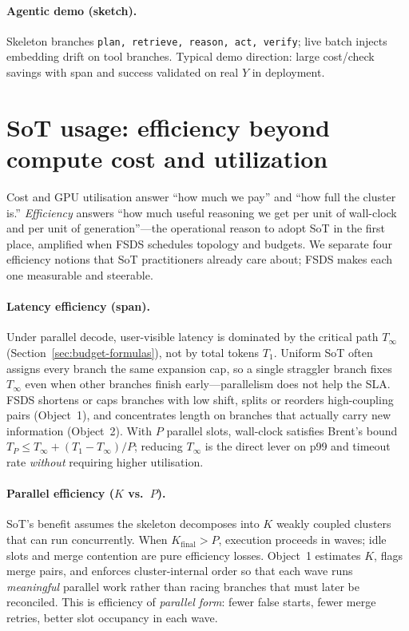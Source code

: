 \documentclass[11pt]{article}
\begin{document}
\paragraph{Agentic demo (sketch).} Skeleton branches
\texttt{plan, retrieve, reason, act, verify}; live batch injects embedding drift
on tool branches. Typical demo direction: large cost/check savings with span and
success validated on real $Y$ in deployment.

\section{SoT usage: efficiency beyond compute cost and utilization}
\label{sec:sot-efficiency}

Cost and GPU utilisation answer ``how much we pay'' and ``how full the cluster
is.'' \emph{Efficiency} answers ``how much useful reasoning we get per unit of
wall-clock and per unit of generation''---the operational reason to adopt SoT in
the first place, amplified when FSDS schedules topology and budgets. We separate
four efficiency notions that SoT practitioners already care about; FSDS makes
each one measurable and steerable.

\paragraph{Latency efficiency (span).} Under parallel decode, user-visible latency
is dominated by the critical path $T_\infty$ (Section~\ref{sec:budget-formulas}),
not by total tokens $T_1$. Uniform SoT often assigns every branch the same
expansion cap, so a single straggler branch fixes $T_\infty$ even when other
branches finish early---parallelism does not help the SLA. FSDS shortens or caps
branches with low shift, splits or reorders high-coupling pairs (Object~1), and
concentrates length on branches that actually carry new information (Object~2).
With $P$ parallel slots, wall-clock satisfies Brent's bound
$T_P \le T_\infty + (T_1-T_\infty)/P$; reducing $T_\infty$ is the direct lever on
p99 and timeout rate \emph{without} requiring higher utilisation.

\paragraph{Parallel efficiency ($K$ vs.\ $P$).} SoT's benefit assumes the skeleton
decomposes into $K$ weakly coupled clusters that can run concurrently. When
$K_{\mathrm{final}}>P$, execution proceeds in waves; idle slots and merge
contention are pure efficiency losses. Object~1 estimates $K$, flags merge pairs,
and enforces cluster-internal order so that each wave runs \emph{meaningful}
parallel work rather than racing branches that must later be reconciled. This is
efficiency of \emph{parallel form}: fewer false starts, fewer merge retries, better
slot occupancy in each wave.
\end{document}
